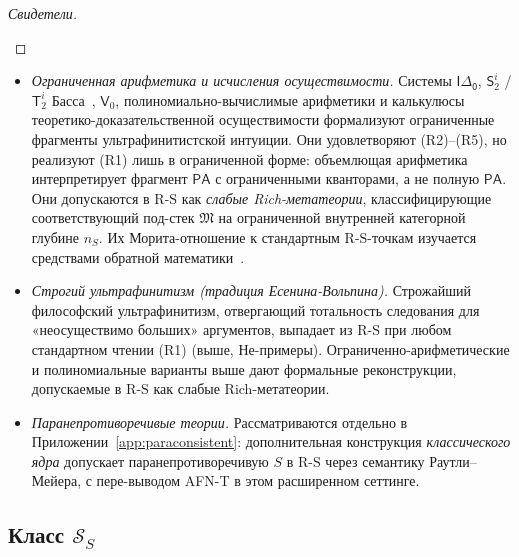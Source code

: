 \documentclass[11pt]{article}
\theoremstyle{plain}
\theoremstyle{definition}
\newcommand{\RS}{\mathrm{R\text{-}S}}
\newcommand{\cS}{\mathcal{S}}
\newcommand{\fM}{\mathfrak{M}}
\begin{document}
\begin{proof}[Свидетели]
\begin{itemize}[nosep]
\end{itemize}
\end{proof}

\begin{itemize}
\item \emph{Ограниченная арифметика и исчисления осуществимости.} Системы $\mathsf{I\Delta_0}$, $\mathsf{S}_2^i$ / $\mathsf{T}_2^i$ Басса~\cite{Buss1986}, $\mathsf{V}_0$, полиномиально-вычислимые арифметики и калькулюсы теоретико-доказательственной осуществимости формализуют ограниченные фрагменты ультрафинитистской интуиции. Они удовлетворяют (R2)--(R5), но реализуют (R1) лишь в ограниченной форме: объемлющая арифметика интерпретирует фрагмент $\mathsf{PA}$ с ограниченными кванторами, а не полную $\mathsf{PA}$. Они допускаются в $\RS$ как \emph{слабые Rich-метатеории}, классифицирующие соответствующий под-стек $\fM$ на ограниченной внутренней категорной глубине $n_S$. Их Морита-отношение к стандартным $\RS$-точкам изучается средствами обратной математики~\cite{Simpson2009}.
\item \emph{Строгий ультрафинитизм (традиция Есенина-Вольпина).} Строжайший философский ультрафинитизм, отвергающий тотальность следования для «неосуществимо больших» аргументов, выпадает из $\RS$ при любом стандартном чтении (R1) (выше, Не-примеры). Ограниченно-арифметические и полиномиальные варианты выше дают формальные реконструкции, допускаемые в $\RS$ как слабые Rich-метатеории.
\item \emph{Паранепротиворечивые теории.} Рассматриваются отдельно в Приложении~\ref{app:paraconsistent}: дополнительная конструкция \emph{классического ядра} допускает паранепротиворечивую $S$ в $\RS$ через семантику Раутли--Мейера, с пере-выводом AFN-T в этом расширенном сеттинге.
\end{itemize}

\subsection{\texorpdfstring{Класс $\cS_S$}{Класс S\_S}}
\end{document}

